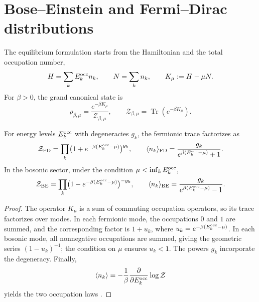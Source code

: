 \section{Bose--Einstein and Fermi--Dirac distributions}
\label{v:v:rec:ocupacion:section:02}

The equilibrium formulation starts from the Hamiltonian and the total
occupation number,
\begin{equation}
 H=\sum_kE_k^{\rm occ} n_k,
 \qquad
 N=\sum_k n_k,
 \qquad
 K_\mu:=H-\mu N.
 \label{v:v:rec:eq:hamiltoniano-gran-canonico-rev3}
\end{equation}
For \(\beta>0\), the grand canonical state is
\begin{equation}
 \rho_{\beta,\mu}
 =\frac{e^{-\beta K_\mu}}{\mathcal Z_{\beta,\mu}},
 \qquad
 \mathcal Z_{\beta,\mu}
 =\operatorname{Tr}(e^{-\beta K_\mu}).
 \label{v:v:rec:eq:estado-gran-canonico-rev3}
\end{equation}

\begin{theorem}
\label{v:v:rec:thm:factorizacion-gran-canonica-rev3}
For energy levels \(E_k^{\rm occ}\) with degeneracies \(g_k\), the
fermionic trace factorizes as
\begin{equation}
 \mathcal Z_{\rm FD}
 =\prod_k\bigl(1+e^{-\beta(E_k^{\rm occ}-\mu)}\bigr)^{g_k},
 \qquad
 \langle n_k\rangle_{\rm FD}
 =\frac{g_k}{e^{\beta(E_k^{\rm occ}-\mu)}+1}.
 \label{v:v:rec:eq:factorizacion-fd-rev3}
\end{equation}
In the bosonic sector, under the condition
\(\mu<\inf_kE_k^{\rm occ}\),
\begin{equation}
 \mathcal Z_{\rm BE}
 =\prod_k\bigl(1-e^{-\beta(E_k^{\rm occ}-\mu)}\bigr)^{-g_k},
 \qquad
 \langle n_k\rangle_{\rm BE}
 =\frac{g_k}{e^{\beta(E_k^{\rm occ}-\mu)}-1}.
 \label{v:v:rec:eq:factorizacion-be-rev3}
\end{equation}
\end{theorem}

\begin{proof}
The operator \(K_\mu\) is a sum of commuting occupation operators, so
its trace factorizes over modes. In each fermionic mode, the
occupations \(0\) and \(1\) are summed, and the corresponding factor is
\(1+u_k\), where
\(u_k=e^{-\beta(E_k^{\rm occ}-\mu)}\). In each bosonic mode, all
nonnegative occupations are summed, giving the geometric series
\((1-u_k)^{-1}\); the condition on \(\mu\) ensures \(u_k<1\). The
powers \(g_k\) incorporate the degeneracy. Finally,
\[
 \langle n_k\rangle
 =-\frac1\beta\frac{\partial}{\partial E_k^{\rm occ}}
   \log\mathcal Z
\]
yields the two occupation laws
\cite{v:Bose1924,v:Einstein1924,v:Fermi1926,v:Dirac1926,v:Pathria2011}.
\end{proof}

